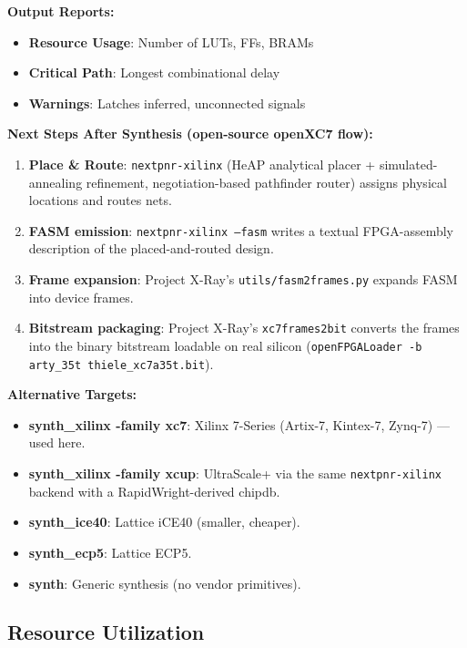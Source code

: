\textbf{Output Reports:}
\begin{itemize}
    \item \textbf{Resource Usage}: Number of LUTs, FFs, BRAMs
    \item \textbf{Critical Path}: Longest combinational delay
    \item \textbf{Warnings}: Latches inferred, unconnected signals
\end{itemize}

\textbf{Next Steps After Synthesis (open-source openXC7 flow):}
\begin{enumerate}
    \item \textbf{Place \& Route}: \texttt{nextpnr-xilinx} (HeAP analytical
          placer + simulated-annealing refinement, negotiation-based
          pathfinder router) assigns physical locations and routes nets.
    \item \textbf{FASM emission}: \texttt{nextpnr-xilinx --fasm} writes a
          textual FPGA-assembly description of the placed-and-routed design.
    \item \textbf{Frame expansion}: Project X-Ray's
          \texttt{utils/fasm2frames.py} expands FASM into device frames.
    \item \textbf{Bitstream packaging}: Project X-Ray's
          \texttt{xc7frames2bit} converts the frames into the binary
          bitstream loadable on real silicon (\texttt{openFPGALoader -b
          arty\_35t thiele\_xc7a35t.bit}).
\end{enumerate}

\textbf{Alternative Targets:}
\begin{itemize}
    \item \textbf{synth\_xilinx -family xc7}: Xilinx 7-Series (Artix-7, Kintex-7,
          Zynq-7) — used here.
    \item \textbf{synth\_xilinx -family xcup}: UltraScale+ via the same
          \texttt{nextpnr-xilinx} backend with a RapidWright-derived chipdb.
    \item \textbf{synth\_ice40}: Lattice iCE40 (smaller, cheaper).
    \item \textbf{synth\_ecp5}: Lattice ECP5.
    \item \textbf{synth}: Generic synthesis (no vendor primitives).
\end{itemize}

\subsection{Resource Utilization}

